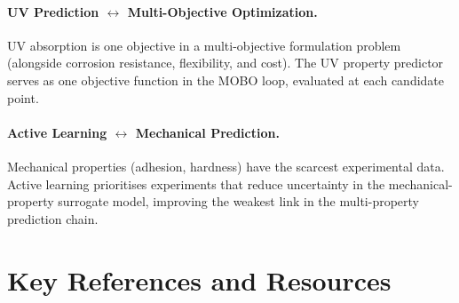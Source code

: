 \documentclass[11pt,a4paper]{article}
\begin{document}
\paragraph{UV Prediction $\leftrightarrow$ Multi-Objective Optimization.}
UV absorption is one objective in a multi-objective formulation problem (alongside corrosion resistance, flexibility, and cost).
The UV property predictor serves as one objective function in the MOBO loop, evaluated at each candidate point.

\paragraph{Active Learning $\leftrightarrow$ Mechanical Prediction.}
Mechanical properties (adhesion, hardness) have the scarcest experimental data.
Active learning prioritises experiments that reduce uncertainty in the mechanical-property surrogate model, improving the weakest link in the multi-property prediction chain.

\section{Key References and Resources}
\label{sec:references}
\end{document}

